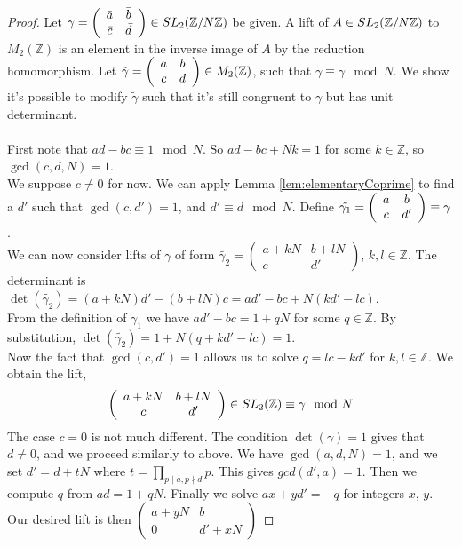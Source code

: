 \begin{proof}
Let $\gamma = \left( \begin{array}{ c c } \bar{a} & \bar{b}  \\ \bar{c} & \bar{d} \end{array} \right) \in SL_2(\mathbb{Z}/N\mathbb{Z})$ be given. A lift of $A \in SL_2(\mathbb{Z}/N\mathbb{Z})$ to  $M_2(\mathbb{Z})$ is an element in the inverse image of $A$ by the reduction homomorphism. Let $\tilde{\gamma} = \left(
  \begin{array}{ c c }
     a & b \\
     c & d
  \end{array} \right) \in M_2(\mathbb{Z})$, such that $\tilde{\gamma} \equiv \gamma \mod N$.
We show it's possible to modify $\tilde{\gamma}$ such that it's still congruent to $\gamma$ but has unit determinant.\\
\\
First note that $ad -bc \equiv 1 \mod N$. So $ad - bc +Nk = 1$ for some $k \in \mathbb{Z}$, so $\gcd(c,d,N) = 1$.\\
We suppose $c \neq 0$ for now. We can apply Lemma \ref{lem:elementaryCoprime} to find a $d'$ such that $\gcd(c,d') =1$, and $d' \equiv d \mod N$. Define $\tilde{\gamma_1} = \left( \begin{array}{ c c } a & b \\ c & d' \end{array} \right) \equiv \gamma$.\\
We can now consider lifts of $\gamma$ of form $ \tilde{\gamma_2} = \left(
    \begin{array}{cc}
        a+kN & b+lN  \\
        c    & d'
    \end{array} \right)$, $k,l \in \mathbb{Z}$. The determinant is $\det(\tilde{\gamma_2}) = (a+kN)d' - (b+lN)c = ad' - bc +N(kd'-lc)$.\\  From the definition of $\gamma_1$ we have $ad' - bc = 1 + qN$ for some $q\in \mathbb{Z}$. By substitution, $\det(\tilde{\gamma_2}) = 1 + N(q + kd' - lc) = 1$.\\
Now the fact that $\gcd(c,d') = 1$ allows us to solve $q = lc - kd'$ for $k,l 
\in \mathbb{Z}$. We obtain the lift,
$$\left(
    \begin{array}{cc}
        a +kN & b +lN  \\
        c    & d'
    \end{array} \right) \in SL_2(\mathbb{Z}) \equiv \gamma \mod N$$
The case $c = 0$ is not much different. The condition $\det(\gamma) =1$ gives that $d \neq 0$, and we proceed similarly to above. We have $\gcd(a,d,N) =1$, and we set $d' = d + tN$ where $t = \prod_{p\mid a,p\nmid d}p$. This gives $gcd(d',a) =1$. Then we compute $q$ from $ad = 1+qN$. Finally we solve $ax + yd' = -q$ for integers $x, \,y$. Our desired lift is then $\left(
    \begin{array}{cc}
        a+yN & b  \\
        0    & d' + xN
    \end{array} \right)$
\end{proof}



